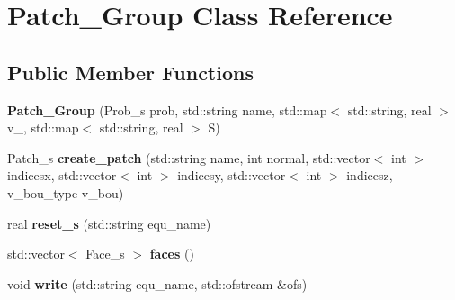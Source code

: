 \hypertarget{classPatch__Group}{
\section{Patch\_\-Group Class Reference}
\label{classPatch__Group}
}
\subsection*{Public Member Functions}
\begin{DoxyCompactItemize}
\item 
\hypertarget{classPatch__Group_a7585b36431136e14c2d17e84388969be}{
{\bfseries Patch\_\-Group} (Prob\_\-s prob, std::string name, std::map$<$ std::string, real $>$ v\_, std::map$<$ std::string, real $>$ S)}
\label{classPatch__Group_a7585b36431136e14c2d17e84388969be}

\item 
\hypertarget{classPatch__Group_ac6290b8246aae78eb11753c4d512c688}{
Patch\_\-s {\bfseries create\_\-patch} (std::string name, int normal, std::vector$<$ int $>$ indicesx, std::vector$<$ int $>$ indicesy, std::vector$<$ int $>$ indicesz, v\_\-bou\_\-type v\_\-bou)}
\label{classPatch__Group_ac6290b8246aae78eb11753c4d512c688}

\item 
\hypertarget{classPatch__Group_ada9f56e3be9279ff5d555f2192cfc45b}{
real {\bfseries reset\_\-s} (std::string equ\_\-name)}
\label{classPatch__Group_ada9f56e3be9279ff5d555f2192cfc45b}

\item 
\hypertarget{classPatch__Group_a326628f83583bb2194f8c82548e9b6b3}{
std::vector$<$ Face\_\-s $>$ {\bfseries faces} ()}
\label{classPatch__Group_a326628f83583bb2194f8c82548e9b6b3}

\item 
\hypertarget{classPatch__Group_a3de7d3df9923795d4cbfa4d908e53598}{
void {\bfseries write} (std::string equ\_\-name, std::ofstream \&ofs)}
\label{classPatch__Group_a3de7d3df9923795d4cbfa4d908e53598}

\end{DoxyCompactItemize}
